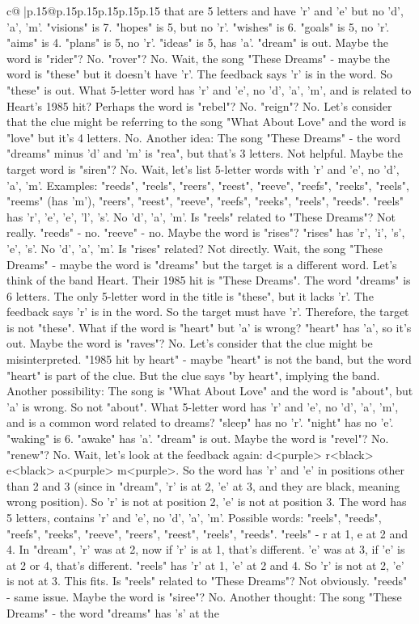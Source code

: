 \documentclass{article}
\begin{document}
{\begin{supertabular}{c@{$\;$}|p{.15\linewidth}@{}p{.15\linewidth}p{.15\linewidth}p{.15\linewidth}p{.15\linewidth}p{.15\linewidth}}
{{{that are 5 letters and have 'r' and 'e' but no 'd', 'a', 'm'. "visions" is 7. "hopes" is 5, but no 'r'. "wishes" is 6. "goals" is 5, no 'r'. "aims" is 4. "plans" is 5, no 'r'. "ideas" is 5, has 'a'. "dream" is out. Maybe the word is "rider"? No. "rover"? No. Wait, the song "These Dreams" {-} maybe the word is "these" but it doesn't have 'r'. The feedback says 'r' is in the word. So "these" is out. What 5{-}letter word has 'r' and 'e', no 'd', 'a', 'm', and is related to Heart's 1985 hit? Perhaps the word is "rebel"? No. "reign"? No. Let's consider that the clue might be referring to the song "What About Love" and the word is "love" but it's 4 letters. No. Another idea: The song "These Dreams" {-} the word "dreams" minus 'd' and 'm' is "rea", but that's 3 letters. Not helpful. Maybe the target word is "siren"? No. Wait, let's list 5{-}letter words with 'r' and 'e', no 'd', 'a', 'm'. Examples: "reeds", "reels", "reers", "reest", "reeve", "reefs", "reeks", "reels", "reems" (has 'm'), "reers", "reest", "reeve", "reefs", "reeks", "reels", "reeds". "reels" has 'r', 'e', 'e', 'l', 's'. No 'd', 'a', 'm'. Is "reels" related to "These Dreams"? Not really. "reeds" {-} no. "reeve" {-} no. Maybe the word is "rises"? "rises" has 'r', 'i', 's', 'e', 's'. No 'd', 'a', 'm'. Is "rises" related? Not directly. Wait, the song "These Dreams" {-} maybe the word is "dreams" but the target is a different word. Let's think of the band Heart. Their 1985 hit is "These Dreams". The word "dreams" is 6 letters. The only 5{-}letter word in the title is "these", but it lacks 'r'. The feedback says 'r' is in the word. So the target must have 'r'. Therefore, the target is not "these". What if the word is "heart" but 'a' is wrong? "heart" has 'a', so it's out. Maybe the word is "raves"? No. Let's consider that the clue might be misinterpreted. "1985 hit by heart" {-} maybe "heart" is not the band, but the word "heart" is part of the clue. But the clue says "by heart", implying the band. Another possibility: The song is "What About Love" and the word is "about", but 'a' is wrong. So not "about". What 5{-}letter word has 'r' and 'e', no 'd', 'a', 'm', and is a common word related to dreams? "sleep" has no 'r'. "night" has no 'e'. "waking" is 6. "awake" has 'a'. "dream" is out. Maybe the word is "revel"? No. "renew"? No. Wait, let's look at the feedback again: d<purple> r<black> e<black> a<purple> m<purple>. So the word has 'r' and 'e' in positions other than 2 and 3 (since in "dream", 'r' is at 2, 'e' at 3, and they are black, meaning wrong position). So 'r' is not at position 2, 'e' is not at position 3. The word has 5 letters, contains 'r' and 'e', no 'd', 'a', 'm'. Possible words: "reels", "reeds", "reefs", "reeks", "reeve", "reers", "reest", "reels", "reeds". "reels" {-} r at 1, e at 2 and 4. In "dream", 'r' was at 2, now if 'r' is at 1, that's different. 'e' was at 3, if 'e' is at 2 or 4, that's different. "reels" has 'r' at 1, 'e' at 2 and 4. So 'r' is not at 2, 'e' is not at 3. This fits. Is "reels" related to "These Dreams"? Not obviously. "reeds" {-} same issue. Maybe the word is "siree"? No. Another thought: The song "These Dreams" {-} the word "dreams" has 's' at the }}}
\end{supertabular}}
\end{document}
